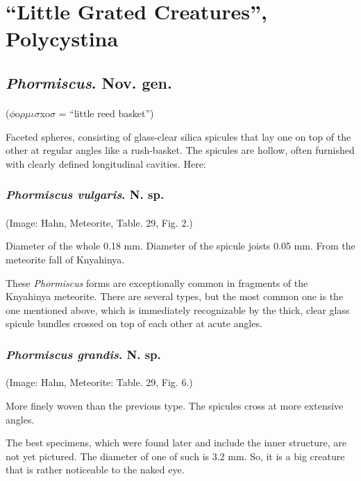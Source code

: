 \documentclass[a4paper, 12pt, oneside]{article}
\begin{document}
\section{``Little Grated Creatures'', Polycystina}
\subsection{\emph{Phormiscus}. Nov. gen.}
\paragraph{}
($\phi$o$\rho\mu\iota\sigma$xo$\sigma$ = ``little reed basket'')%

Faceted spheres, consisting of glass-clear silica spicules that lay one on top of the other at regular angles like a rush-basket. The spicules are hollow, often furnished with clearly defined longitudinal cavities. Here:
\subsubsection{\emph{Phormiscus vulgaris}. N. sp.}
\paragraph{}
(Image: Hahn, Meteorite, Table. 29, Fig. 2.)

Diameter of the whole 0.18 mm. Diameter of the spicule joists 0.05 mm. From the meteorite fall of Knyahinya.

These \emph{Phormiscus} forms are exceptionally common in fragments of the Knyahinya meteorite. There are several types, but the most common one is the one mentioned above, which is immediately recognizable by the thick, clear glass spicule bundles crossed on top of each other at acute angles.
\subsubsection{\emph{Phormiscus grandis}. N. sp.}
\paragraph{}
(Image: Hahn, Meteorite: Table. 29, Fig. 6.)

More finely woven than the previous type. The spicules cross at more extensive angles.

The best specimens, which were found later and include the inner structure, are not yet pictured. The diameter of one of such is 3.2 mm. So, it is a big creature that is rather noticeable to the naked eye.
\end{document}
